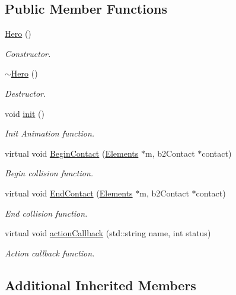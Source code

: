 \subsection*{Public Member Functions}
\begin{DoxyCompactItemize}
\item 
\hyperlink{class_hero_ab5920677a4b5cb59d6f513922d037dca}{Hero} ()
\begin{DoxyCompactList}\small\item\em Constructor. \end{DoxyCompactList}\item 
\hyperlink{class_hero_a5aeef41ede5a80dc29c5acd7b553c4da}{$\sim$\-Hero} ()
\begin{DoxyCompactList}\small\item\em Destructor. \end{DoxyCompactList}\item 
void \hyperlink{class_hero_ae67cc4b7770083755895b78664d0ea34}{init} ()
\begin{DoxyCompactList}\small\item\em Init Animation function. \end{DoxyCompactList}\item 
virtual void \hyperlink{class_hero_ac23c090d8f5e2768b4175580a0d53d1b}{Begin\-Contact} (\hyperlink{class_elements}{Elements} $\ast$m, b2\-Contact $\ast$contact)
\begin{DoxyCompactList}\small\item\em Begin collision function. \end{DoxyCompactList}\item 
virtual void \hyperlink{class_hero_a9fee92d1b0df478f95bc10ba84015d2a}{End\-Contact} (\hyperlink{class_elements}{Elements} $\ast$m, b2\-Contact $\ast$contact)
\begin{DoxyCompactList}\small\item\em End collision function. \end{DoxyCompactList}\item 
virtual void \hyperlink{class_hero_aa41ef53abd25057ceb431811ccf80ad5}{action\-Callback} (std\-::string name, int status)
\begin{DoxyCompactList}\small\item\em Action callback function. \end{DoxyCompactList}\end{DoxyCompactItemize}
\subsection*{Additional Inherited Members}



